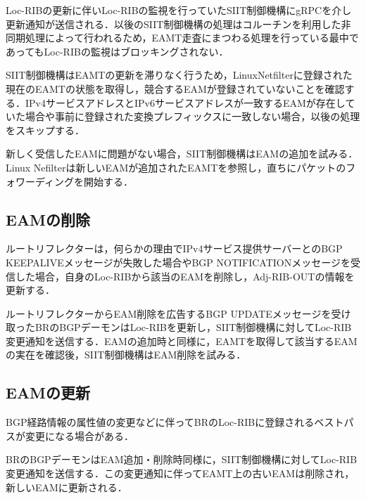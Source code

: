 Loc-RIBの更新に伴いLoc-RIBの監視を行っていたSIIT制御機構にgRPCを介し更新通知が送信される．以後のSIIT制御機構の処理はコルーチンを利用した非同期処理によって行われるため，EAMT走査にまつわる処理を行っている最中であってもLoc-RIBの監視はブロッキングされない．

SIIT制御機構はEAMTの更新を滞りなく行うため，LinuxNetfilterに登録された現在のEAMTの状態を取得し，競合するEAMが登録されていないことを確認する．IPv4サービスアドレスとIPv6サービスアドレスが一致するEAMが存在していた場合や事前に登録された変換プレフィックスに一致しない場合，以後の処理をスキップする．

新しく受信したEAMに問題がない場合，SIIT制御機構はEAMの追加を試みる．Linux Nefilterは新しいEAMが追加されたEAMTを参照し，直ちにパケットのフォワーディングを開始する．

\subsection{EAMの削除}
ルートリフレクターは，何らかの理由でIPv4サービス提供サーバーとのBGP KEEPALIVEメッセージが失敗した場合やBGP NOTIFICATIONメッセージを受信した場合，自身のLoc-RIBから該当のEAMを削除し，Adj-RIB-OUTの情報を更新する．

ルートリフレクターからEAM削除を広告するBGP UPDATEメッセージを受け取ったBRのBGPデーモンはLoc-RIBを更新し，SIIT制御機構に対してLoc-RIB変更通知を送信する．EAMの追加時と同様に，EAMTを取得して該当するEAMの実在を確認後，SIIT制御機構はEAM削除を試みる．

\subsection{EAMの更新}
BGP経路情報の属性値の変更などに伴ってBRのLoc-RIBに登録されるベストパスが変更になる場合がある．

BRのBGPデーモンはEAM追加・削除時同様に，SIIT制御機構に対してLoc-RIB変更通知を送信する．この変更通知に伴ってEAMT上の古いEAMは削除され，新しいEAMに更新される．




